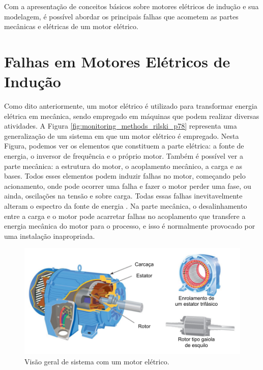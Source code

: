 Com a apresentação de conceitos básicos sobre motores elétricos de indução e sua modelagem, é possível abordar os principais falhas que 
acometem as partes mecânicas e elétricas de um motor elétrico.


% 

\section{Falhas em Motores Elétricos de Indução}\label{sec:}

Como dito anteriormente, um motor elétrico é utilizado para transformar energia elétrica em mecânica, sendo empregado em máquinas que podem
realizar diversas atividades. A Figura \ref{fig:monitoring_methods_rilski_p78} representa uma generalização de um sistema em que um motor
elétrico é empregado. Nesta Figura, podemos ver os elementos que constituem a parte elétrica: a fonte de energia, o inversor de frequência e
o próprio motor. Também é possível ver a parte mecânica: a estrutura do motor, o acoplamento mecânico, a carga e as bases. Todos esses
elementos podem induzir falhas no motor, começando pelo acionamento, onde pode ocorrer uma falha e fazer o motor perder uma fase, ou ainda, 
oscilações na tensão e sobre carga. Todas essas falhas inevitavelmente alteram o espectro da fonte de energia . 
Na parte mecânica, o desalinhamento entre a carga e o motor pode acarretar falhas no acoplamento que transfere a energia mecânica do motor
para o processo, e isso é normalmente provocado por uma instalação inapropriada.

\begin{figure}[H]
    \caption{Visão geral de sistema com um motor elétrico.}
    \begin{center}
        \includegraphics[scale=0.9, page=2]{referencial/img/imagens_referencial.pdf}
    \end{center}
    \label{fig:motor_system_rilski_p2}
\end{figure}


